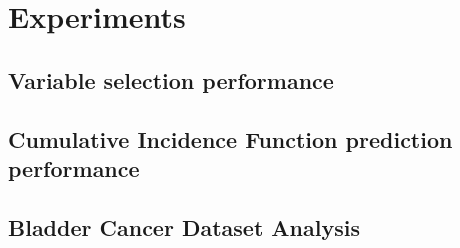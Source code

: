 \chapter{Experiments}
\label{ch:experiments}

\section{Variable selection performance}
\section{Cumulative Incidence Function prediction performance}
\section{Bladder Cancer Dataset Analysis}